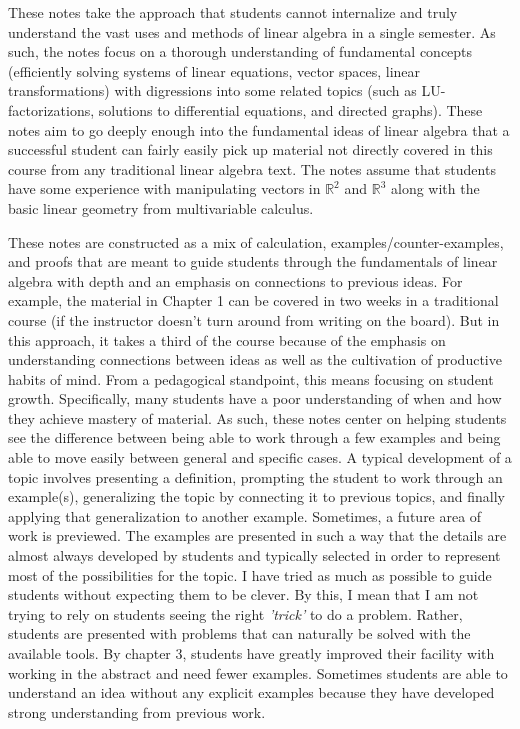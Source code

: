 \begin{annotation}
These notes take the approach that students cannot internalize and truly understand the vast uses and methods of linear algebra in a single semester. As such, the notes focus on a thorough understanding of fundamental concepts (efficiently solving systems of linear equations, vector spaces, linear transformations) with digressions into some related topics (such as LU-factorizations, solutions to differential equations, and directed graphs). These notes aim to go deeply enough into the fundamental ideas of linear algebra that a successful student can fairly easily pick up material not directly covered in this course from any traditional linear algebra text. The notes assume that students have some experience with manipulating vectors in $\mathbb{R}^2$ and $\mathbb{R}^3$ along with the basic linear geometry from multivariable calculus.

These notes are constructed as a mix of calculation, examples/counter-examples, and proofs that are meant to guide students through the fundamentals of linear algebra with depth and an emphasis on connections to previous ideas. For example, the material in Chapter 1 can be covered in two weeks in a traditional course (if the instructor doesn't turn around from writing on the board). But in this approach, it takes a third of the course because of the emphasis on understanding connections between ideas as well as the cultivation of productive habits of mind. From a pedagogical standpoint, this means focusing on student growth. Specifically, many students have a poor understanding of when and how they achieve mastery of material. As such, these notes center on helping students see the difference between being able to work through a few examples and being able to move easily between general and specific cases. A typical development of a topic involves presenting a definition, prompting the student to work through an example(s), generalizing the topic by connecting it to previous topics, and finally applying that generalization to another example. Sometimes, a future area of work is previewed. The examples are presented in such a way that the details are almost always developed  by students and typically selected in order to represent most of the possibilities for the topic. I have tried as much as possible to guide students without expecting them to be clever. By this, I mean that I am not trying to rely on students seeing the right \textit{'trick'} to do a problem. Rather, students are presented with problems that can naturally be solved with the available tools. By chapter 3, students have greatly improved their facility with working in the abstract and need fewer examples. Sometimes students are able to understand an idea without any explicit examples because  they have  developed strong understanding from previous work.


\end{annotation}
